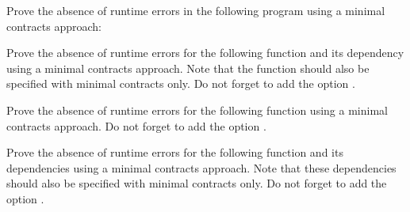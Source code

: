 Prove the absence of runtime errors in the following program using a minimal
contracts approach:






Prove the absence of runtime errors for the following 
function and its dependency using a minimal contracts approach. Note that the
 function should also be specified with minimal contracts only.
Do not forget to add the option .







Prove the absence of runtime errors for the following 
function using a minimal contracts approach. Do not forget to add the option
.






Prove the absence of runtime errors for the following 
function and its dependencies using a minimal contracts approach. Note that
these dependencies should also be specified with minimal contracts only.
Do not forget to add the option .


